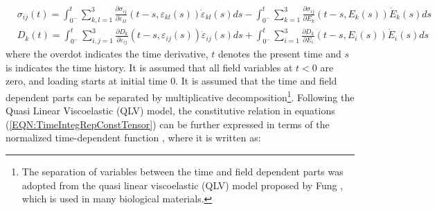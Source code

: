 \begin{equation}
\begin{aligned}
&\sigma_{ij}(t)=
\int_{0^-}^t 
\sum_{k,l=1}^3 \frac{\partial \sigma_{ij}}{\partial\varepsilon_{kl}}(t-s,\varepsilon_{kl}(s)) \dot{\varepsilon}_{kl}(s)ds-
\int_{0^-}^t
\sum_{k=1}^3 \frac{\partial \sigma_{ij}}{\partial E_{k}}(t-s,E_k(s)) \dot{E}_k(s)ds
\\
&D_k(t)=
\int_{0^-}^t 
\sum_{i,j=1}^3 \frac{\partial D_{k}}{\partial\varepsilon_{ij}}(t-s,\varepsilon_{ij}(s))\dot{\varepsilon}_{ij}(s)ds+
\int_{0^-}^t  
\sum_{i=1}^3 \frac{\partial D_{k}}{\partial E_{i}}(t-s,E_i(s)) \dot{E}_i(s) ds
\end{aligned}
\label{EQN:TimeIntegRepConstTensor}
\end{equation}
where the overdot indicates the time derivative, 
$t$ denotes the present time and $s$ is indicates the time history. 
It is assumed that all field variables at $t<0$ are zero, and loading starts at initial time $0$.
It is assumed that the time and field dependent parts can be separated by multiplicative decomposition\footnote{The separation of variables between the time and field dependent parts
was adopted from the quasi linear viscoelastic (QLV) model proposed by Fung
\cite{fung1981biomechanics}, which is used in many biological materials.}. 
Following the Quasi Linear Viscoelastic (QLV) model, the constitutive relation in equations (\ref{EQN:TimeIntegRepConstTensor}) can be further expressed in terms of the normalized time-dependent function \cite{tscharnuter2012nonlinear,fung1981biomechanics}, where it is written as:

